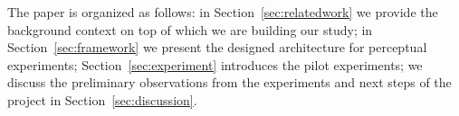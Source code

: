 The paper is organized as follows: in Section~\ref{sec:relatedwork} we provide the background context on top of which we are building our study; in Section~\ref{sec:framework} we present the designed architecture for perceptual experiments; Section~\ref{sec:experiment} introduces the pilot experiments; we discuss the preliminary observations from the experiments and next steps of the project in Section~\ref{sec:discussion}.

%
%
%
%

